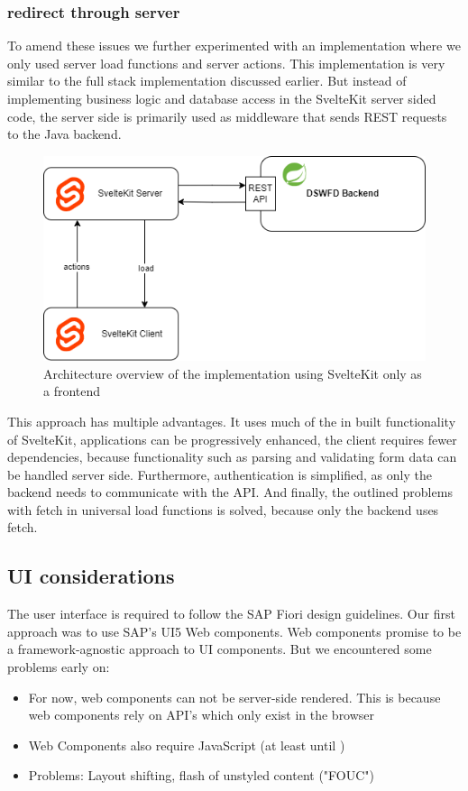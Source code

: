 \subsubsection{redirect through server}

To amend these issues we further experimented with an implementation where we only used server load functions and server actions. This implementation is very similar to the full stack implementation discussed earlier. But instead of implementing business logic and database access in the SvelteKit server sided code, the server side is primarily used as middleware that sends REST requests to the Java backend.

\begin{figure}[ht]
    \centering
    \includegraphics[width=.6\linewidth]{assets/fe-only-all-server}
    \caption{Architecture overview of the implementation using SvelteKit only as a frontend}
    \label{fig:dswfd-architecture-fe-through-server}
\end{figure}

This approach has multiple advantages. It uses much of the in built functionality of SvelteKit, applications can be progressively enhanced, the client requires fewer dependencies, because functionality such as parsing and validating form data can be handled server side. Furthermore, authentication is simplified, as only the backend needs to communicate with the API. And finally, the outlined problems with fetch in universal load functions is solved, because only the backend uses fetch.


\subsection{UI considerations}
\label{sec:implementation-ui}

The user interface is required to follow the SAP Fiori design guidelines. Our first approach was to use SAP's UI5 Web components. Web components promise to be a framework-agnostic approach to UI components. But we encountered some problems early on:

\begin{itemize}
    \item For now, web components can not be server-side rendered. This is because web components rely on API's which only exist in the browser
    \item Web Components also require JavaScript (at least until \cite{noauthor_declarative_2023})
    \item Problems: Layout shifting, flash of unstyled content ("FOUC")
\end{itemize}
